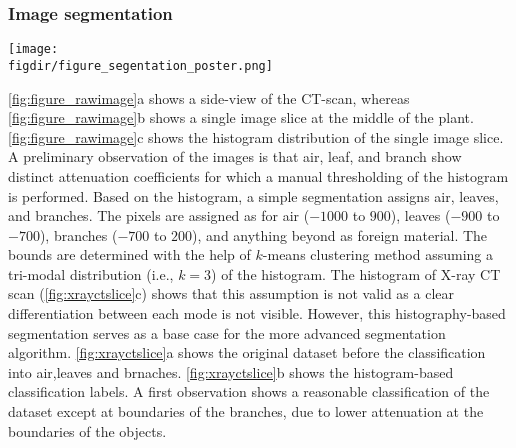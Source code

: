 \subsubsection*{Image segmentation}


\begin{sidewaysfigure}[p]
	\centering
	\texttt{[image: \\figdir/figure\_segentation\_poster.png]}
	\caption{Segmentation of the X-ray CT scan:  slice of original X-ray CT dataset,  segmentation using user-defined histogram threshold and  segmentation using Trainable WEKA Segmentation and additional morphological operation (opening + closing). Only a sub-region of an image slice is shown for clarity. The segmented pixels are labeled as air ($0$, purple), leaf ($1$, blue) and branch ($2$, yellow).}
	\label{fig:xrayctslice}
\end{sidewaysfigure}

\cref{fig:figure_rawimage}a shows a side-view of the CT-scan, whereas \cref{fig:figure_rawimage}b shows a single image slice at the middle of the plant. \cref{fig:figure_rawimage}c shows the histogram distribution of the single image slice. A preliminary observation of the images is that air, leaf, and branch show distinct attenuation coefficients for which a manual thresholding of the histogram is performed. Based on the histogram, a simple segmentation assigns air, leaves, and branches. The pixels are assigned as for air ($-1000$ to $900$), leaves ($-900$ to $-700$), branches ($-700$ to $200$), and anything beyond as foreign material. The bounds are determined with the help of $k$-means clustering method assuming a tri-modal distribution (i.e., $k=3$) of the histogram. The histogram of X-ray CT scan (\cref{fig:xrayctslice}c) shows that this assumption is not valid as a clear differentiation between each mode is not visible. However, this histography-based segmentation serves as a base case for the more advanced segmentation algorithm. \cref{fig:xrayctslice}a shows the original dataset before the classification into air,leaves and brnaches. \cref{fig:xrayctslice}b shows the histogram-based classification labels. A first observation shows a reasonable classification of the dataset except at boundaries of the branches, due to lower attenuation at the boundaries of the objects.

